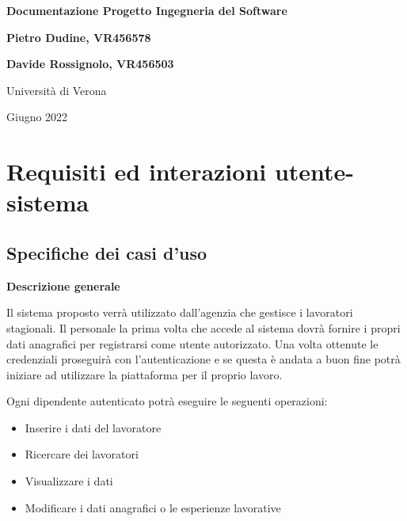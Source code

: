 \documentclass{article}
\begin{document}
\renewcommand{\labelenumii}{\arabic{enumi}.\arabic{enumii}}
\begin{titlepage}
   \begin{center}
        \Huge        
        \textbf{Documentazione Progetto Ingegneria del Software}
            
        \vspace{1.5cm}
        \Large
        \textbf{Pietro Dudine, VR456578}
       
        \textbf{Davide Rossignolo, VR456503}

        \vfill
            
        \vspace{0.8cm}
            
        Università di Verona
        
        Giugno 2022
            
   \end{center}
\end{titlepage}

\tableofcontents
\newpage

\section{Requisiti ed interazioni utente-sistema}
    \subsection{Specifiche dei casi d'uso}
    \textbf{Descrizione generale}
    
    Il sistema proposto verrà utilizzato dall'agenzia che gestisce i lavoratori stagionali. Il personale la prima volta che accede al sistema dovrà fornire i propri dati anagrafici per registrarsi come utente autorizzato. Una volta ottenute le credenziali proseguirà con l'autenticazione e se questa è andata a buon fine potrà iniziare ad utilizzare la piattaforma per il proprio lavoro.
    
    Ogni dipendente autenticato potrà eseguire le seguenti operazioni:
    \begin{itemize}
        \item Inserire i dati del lavoratore
        \item Ricercare dei lavoratori 
        \item Visualizzare i dati
        \item Modificare i dati anagrafici o le esperienze lavorative
    \end{itemize}
    
\end{document}

